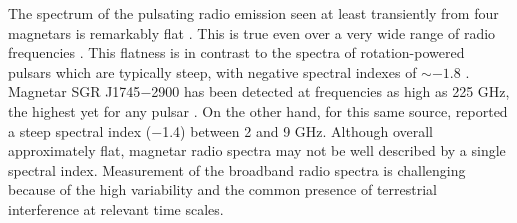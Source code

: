 
The spectrum of the pulsating radio emission seen at least transiently from
four magnetars is remarkably flat \citep{crp+07,crhr07,ljk+08,lbb+10}. 
This is true even over a very wide range of radio frequencies
\citep[e.g. 1.4--45 GHz for 1E~1547.0$-$5408][]{crj+08}.  
This flatness is in contrast to the spectra of rotation-powered pulsars which are typically
steep, with negative spectral indexes of $\sim -1.8$ \citep[e.g.][]{mkkw00a}.
Magnetar SGR J1745$-$2900
has been detected at frequencies as high as 225 GHz, the highest
yet for any pulsar \citep{tek+15}.  On the other hand, for this same source,
\citet{ppe+15} reported a steep spectral index ($-$1.4) between 2 and 9 GHz.
Although overall approximately flat, magnetar radio spectra may not be well described by a single spectral index.
Measurement of the broadband radio spectra is 
challenging because of the high variability and the common presence of
terrestrial interference at relevant time scales.




